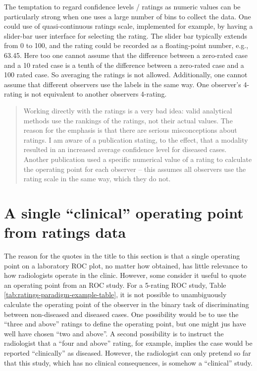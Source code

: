 \documentclass[
]{book}
\begin{document}
The temptation to regard confidence levels / ratings as numeric values can be particularly strong when one uses a large number of bins to collect the data. One could use of quasi-continuous ratings scale, implemented for example, by having a slider-bar user interface for selecting the rating. The slider bar typically extends from 0 to 100, and the rating could be recorded as a floating-point number, e.g., 63.45. Here too one cannot assume that the difference between a zero-rated case and a 10 rated case is a tenth of the difference between a zero-rated case and a 100 rated case. So averaging the ratings is not allowed. Additionally, one cannot assume that different observers use the labels in the same way. One observer's 4-rating is not equivalent to another observers 4-rating.

\begin{quote}
Working directly with the ratings is a very bad idea: valid analytical methods use the rankings of the ratings, not their actual values. The reason for the emphasis is that there are serious misconceptions about ratings. I am aware of a publication stating, to the effect, that a modality resulted in an increased average confidence level for diseased cases. Another publication used a specific numerical value of a rating to calculate the operating point for each observer -- this assumes all observers use the rating scale in the same way, which they do not.
\end{quote}

\hypertarget{binary-task-clinical-operating-point}{%
\section{A single ``clinical'' operating point from ratings data}\label{binary-task-clinical-operating-point}}

The reason for the quotes in the title to this section is that a single operating point on a laboratory ROC plot, no matter how obtained, has little relevance to how radiologists operate in the clinic. However, some consider it useful to quote an operating point from an ROC study. For a 5-rating ROC study, Table \ref{tab:ratings-paradigm-example-table}, it is not possible to unambiguously calculate the operating point of the observer in the binary task of discriminating between non-diseased and diseased cases. One possibility would be to use the ``three and above'' ratings to define the operating point, but one might jus have well have chosen ``two and above''. A second possibility is to instruct the radiologist that a ``four and above'' rating, for example, implies the case would be reported ``clinically'' as diseased. However, the radiologist can only pretend so far that this study, which has no clinical consequences, is somehow a ``clinical'' study.
\end{document}
